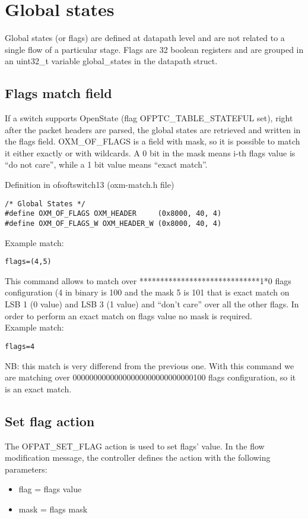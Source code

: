 \chapter{Global states}
\label{chap:global_states}
Global states (or flags) are defined at datapath level and are not related to a single flow of a particular stage.
Flags are 32 boolean registers and are grouped in an uint32\_t variable global\_states in the datapath struct.

\section{Flags match field}
\label{section:oxm_of_flags}

If a switch supports OpenState (flag OFPTC\_TABLE\_STATEFUL set), right after the packet headers are parsed, the global states are retrieved and written in the flags field. OXM\_OF\_FLAGS is a field with mask, so it is possible to match it either exactly or with wildcards. A 0 bit in the mask means i-th flags value is ``do not care'', while a 1 bit value means ``exact match''.

Definition in ofsoftswitch13 (oxm-match.h file)
\begin{lstlisting}[style=customc]
/* Global States */
#define OXM_OF_FLAGS OXM_HEADER     (0x8000, 40, 4)
#define OXM_OF_FLAGS_W OXM_HEADER_W (0x8000, 40, 4)
\end{lstlisting}
Example match:
\begin{lstlisting}[style=customc]
flags=(4,5)
\end{lstlisting}
This command allows to match over *****************************1*0 flags configuration (4 in binary is 100 and the mask 5 is 101 that is exact match on LSB 1 (0 value) and LSB 3 (1 value) and ``don’t care'' over all the other flags. In order to perform an exact match on flags value no mask is required.
\\Example match:
\begin{lstlisting}[style=customc]
flags=4
\end{lstlisting}
NB: this match is very differend from the previous one. With this command we are matching over 00000000000000000000000000000100 flags configuration, so it is an exact match.

\section{Set flag action}
\label{section:set_flag_action}
The OFPAT\_SET\_FLAG action is used to set flags' value.
In the flow modification message, the controller defines the action with the following parameters:
\begin{itemize}
\setlength\itemsep{0em}
\item flag = flags value
\item mask = flags mask
\end{itemize}

